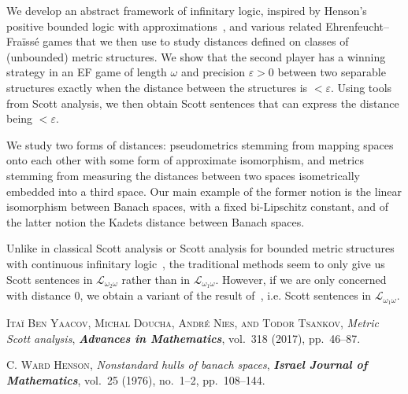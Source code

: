 \documentclass[bsl,meeting]{asl}
\newcommand{\NP}{}
\begin{document}
\thispagestyle{empty}


\NP  
{}



We develop an abstract framework of infinitary logic, inspired by Henson's positive bounded logic with approximations~\cite{cite1}, and various related Ehrenfeucht--Fraïssé games that we then use to study distances defined on classes of (unbounded) metric structures. We show that the second player has a winning strategy in an EF game of length $\omega$ and precision $\varepsilon>0$ between two separable structures exactly when the distance between the structures is $<\varepsilon$. Using tools from Scott analysis, we then obtain Scott sentences that can express the distance being $<\varepsilon$.

We study two forms of distances: pseudometrics stemming from mapping spaces onto each other with some form of approximate isomorphism, and metrics stemming from measuring the distances between two spaces isometrically embedded into a third space. Our main example of the former notion is the linear isomorphism between Banach spaces, with a fixed bi-Lipschitz constant, and of the latter notion the Kadets distance between Banach spaces.

Unlike in classical Scott analysis or Scott analysis for bounded metric structures with continuous infinitary logic~\cite{cite2}, the traditional methods seem to only give us Scott sentences in $\mathcal{L}_{\omega_2\omega}$ rather than in $\mathcal{L}_{\omega_1\omega}$. However, if we are only concerned with distance $0$, we obtain a variant of the result of~\cite{cite2}, i.e. Scott sentences in $\mathcal{L}_{\omega_1\omega}$.


\begin{thebibliography}{10}


{\scshape  Itaï Ben Yaacov, Michal Doucha, André Nies, and Todor Tsankov},
{\itshape Metric Scott analysis},
{\bfseries\itshape Advances in Mathematics},
vol.~318 (2017), %
pp.~46--87.

{\scshape C. Ward Henson},
{\itshape Nonstandard hulls of banach spaces},
{\bfseries\itshape Israel Journal of Mathematics},
vol.~25 (1976), no.~1--2, pp.~108--144.

\end{thebibliography}


\vspace*{-0.5\baselineskip}
\end{document}
